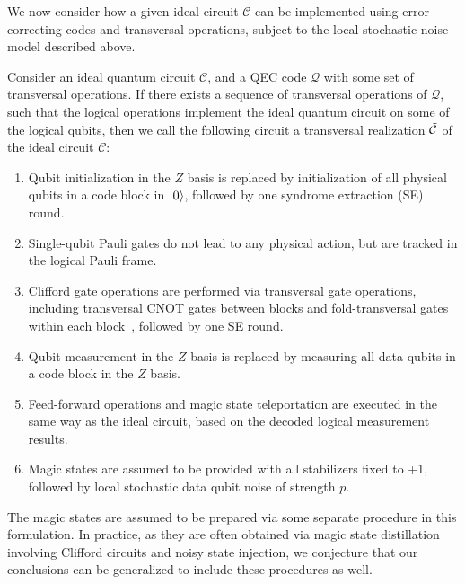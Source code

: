 We now consider how a given ideal circuit $\mathcal{C}$ can be implemented using error-correcting codes and transversal operations, subject to the local stochastic noise model described above.

\begin{definition}
\label{def:error_corrected_circuit}
%
Consider an ideal quantum circuit $\mathcal{C}$, and a QEC code $\mathcal{Q}$ with some set of transversal operations.
%
If there exists a sequence of transversal operations of $\mathcal{Q}$, such that the logical operations implement the ideal quantum circuit on some of the logical qubits, then we call the following circuit a transversal realization $\tilde{\mathcal{C}}$ of the ideal circuit $\mathcal{C}$:
%
\begin{enumerate}
\item Qubit initialization in the $Z$ basis is replaced by initialization of all physical qubits in a code block in $\ket{0}$, followed by one syndrome extraction (SE) round.
\item Single-qubit Pauli gates do not lead to any physical action, but are tracked in the logical Pauli frame.
\item Clifford gate operations are performed via transversal gate operations, including transversal CNOT gates between blocks and fold-transversal gates within each block~\cite{kubica2015unfolding,moussa2016transversal,breuckmann2024fold,quintavalle2023partitioning}, followed by one SE round.
\item Qubit measurement in the $Z$ basis is replaced by measuring all data qubits in a code block in the $Z$ basis.
\item Feed-forward operations and magic state teleportation are executed in the same way as the ideal circuit, based on the decoded logical measurement results.
\item Magic states are assumed to be provided with all stabilizers fixed to +1, followed by local stochastic data qubit noise of strength $p$.
\end{enumerate}
\end{definition}

The magic states are assumed to be prepared via some separate procedure in this formulation.
%
In practice, as they are often obtained via magic state distillation~\cite{bravyi2005universal} involving Clifford circuits and noisy state injection, we conjecture that our conclusions can be generalized to include these procedures as well.

